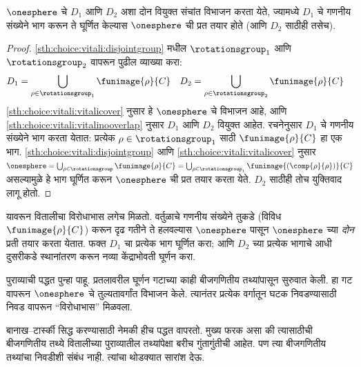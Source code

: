 \begin{lem}\label{sth:choice:vitali:pseudobanachtarski}
$\onesphere$ चे $D_{1}$ आणि $D_{2}$ अशा दोन वियुक्त संचांत विभाजन करता येते, ज्यामध्ये $D_{1}$ चे गणनीय संख्येने भाग करून ते घूर्णित केल्यास $\onesphere$ ची प्रत तयार होते (आणि $D_{2}$ साठीही तसेच).
\end{lem}

\begin{proof}
\ref{sth:choice:vitali:disjointgroup} मधील $\rotationsgroup_{1}$ आणि $\rotationsgroup_{2}$ वापरून पुढील व्याख्या करा:
\begin{align*}
	D_{1} &= \bigcup_{\rho \in \rotationsgroup_1} \funimage{\rho}{C} &
	D_{2} &= \bigcup_{\rho \in \rotationsgroup_2} \funimage{\rho}{C}
\end{align*}
\ref{sth:choice:vitali:vitalicover} नुसार हे $\onesphere$ चे विभाजन आहे, आणि \ref{sth:choice:vitali:vitalinooverlap} नुसार $D_1$ आणि $D_2$ वियुक्त आहेत. रचनेनुसार $D_1$ चे गणनीय संख्येने भाग करता येतात: प्रत्येक $\rho \in \rotationsgroup_1$ साठी $\funimage{\rho}{C}$ हा एक भाग. \ref{sth:choice:vitali:disjointgroup} आणि \ref{sth:choice:vitali:vitalicover} नुसार $\onesphere = \bigcup_{\rho \in
\rotationsgroup}\funimage{\rho}{C} = \bigcup_{\rho \in
\rotationsgroup_1}\funimage{(\comp{\rho}{\rho})}{C}$ असल्यामुळे हे भाग घूर्णित करून $\onesphere$ ची प्रत तयार करता येते. $D_2$ साठीही तोच युक्तिवाद लागू होतो. \end{proof}\noindent यावरून वितालीचा विरोधाभास लगेच मिळतो. वर्तुळाचे गणनीय संख्येने तुकडे (विविध $\funimage{\rho}{C}$) करून दृढ गतीने ते हलवल्यास $\onesphere$ पासून $\onesphere$ च्या \emph{दोन} प्रती तयार करता येतात. फक्त $D_1$ चा प्रत्येक भाग घूर्णित करा; आणि $D_2$ च्या प्रत्येक भागाचे आधी दुसरीकडे स्थानांतरण करून नव्या केंद्राभोवती घूर्णन करा.

पुराव्याची पद्धत पुन्हा पाहू. प्रतलावरील घूर्णन गटाच्या काही बीजगणितीय तथ्यांपासून सुरुवात केली. हा गट वापरून $\onesphere$ चे तुल्यतावर्गांत विभाजन केले. त्यानंतर प्रत्येक वर्गातून घटक निवडण्यासाठी निवड वापरून “विरोधाभास” मिळवला.

बानाख--टार्स्की सिद्ध करण्यासाठी नेमकी हीच पद्धत वापरतो. मुख्य फरक असा की त्यासाठीची बीजगणितीय तथ्ये वितालीच्या पुराव्यातील तथ्यांपेक्षा बरीच गुंतागुंतीची आहेत. पण त्या बीजगणितीय तथ्यांचा निवडीशी संबंध नाही. त्यांचा थोडक्यात सारांश देऊ.

